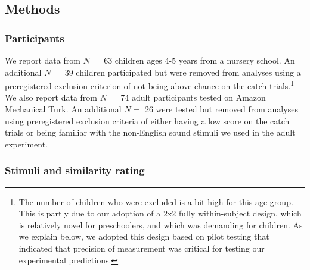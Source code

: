 \documentclass[english,,man]{apa6}
\let\rmarkdownfootnote\footnote%
\def\footnote{\protect\rmarkdownfootnote}
\begin{document}
\hypertarget{methods}{%
\subsection{Methods}\label{methods}}

\hypertarget{participants}{%
\subsubsection{Participants}\label{participants}}

We report data from \(N=\) 63 children ages 4-5 years from a nursery school. An additional \(N=\) 39 children participated but were removed from analyses using a preregistered exclusion criterion of not being above chance on the catch trials.\footnote{The number of children who were excluded is a bit high for this age group. This is partly due to our adoption of a 2x2 fully within-subject design, which is relatively novel for preschoolers, and which was demanding for children. As we explain below, we adopted this design based on pilot testing that indicated that precision of measurement was critical for testing our experimental predictions.} We also report data from \(N=\) 74 adult participants tested on Amazon Mechanical Turk. An additional \(N=\) 26 were tested but removed from analyses using preregistered exclusion criteria of either having a low score on the catch trials or being familiar with the non-English sound stimuli we used in the adult experiment.

\hypertarget{stimuli-and-similarity-rating}{%
\subsubsection{Stimuli and similarity rating}\label{stimuli-and-similarity-rating}}
\end{document}
